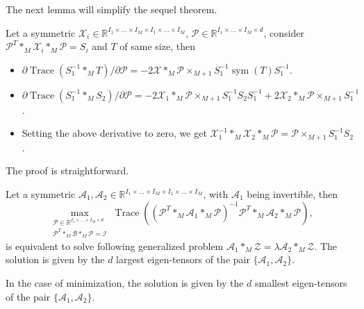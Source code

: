 \documentclass{siamltex}
\begin{document}
\medskip
\noindent
The next lemma will simplify the sequel theorem.
\begin{lemma}\label{pop:derivative_trace}
Let a symmetric $\mathcal{X}_i \in \mathbb{R}^{I_1 \times \ldots \times I_M \times I_1 \times \ldots \times I_M}$, $\mathcal{P} \in \mathbb{R}^{I_1 \times \ldots \times I_M \times d}$, consider $\mathcal{P}^T *_M \mathcal{X}_i *_M \mathcal{P}= S_i$ and $T$ of same size, then
\begin{itemize}
\item $\partial \operatorname{Trace}\left(S_1 ^{-1} *_M T\right)/\partial \mathcal{P}=-2\mathcal{X} *_M \mathcal{P} \times_{M+1} S_1^{-1} \operatorname{sym}(T) S_1^{-1} $.
\item $\partial \operatorname{Trace}\left( S_1^{-1} *_M S_2\right)/\partial \mathcal{P}=-2\mathcal{X}_1 *_M \mathcal{P} \times_{M+1} S_1^{-1} S_2 S_1^{-1} + 2 \mathcal{X}_2 *_M \mathcal{P} \times_{M+1} S_1^{-1}$.
\item Setting the above derivative to zero, we get $\mathcal{X}_1^{-1} *_M \mathcal{X}_2 *_M \mathcal{P}=\mathcal{P} \times_{M+1} S_1^{-1} S_2$.
\end{itemize}
\end{lemma}
\noindent
The proof is straightforward.
\begin{theorem}\label{thm:tr_pos_def_2}
Let a symmetric $\mathcal{A}_1, \mathcal{A}_2 \in \mathbb{R}^{I_1 \times \ldots \times I_M \times I_1 \times \ldots \times I_M}$, with $\mathcal{A}_1$ being invertible, then
\[\max_{\substack{\mathcal{P} \in \mathbb{R}^{I_1 \times \ldots \times I_M \times d}\\ \mathcal{P}^T *_M \mathcal{B} *_M \mathcal{P}=\mathcal{I}}} \operatorname{Trace}\left( \left(\mathcal{P}^T *_M \mathcal{A}_1 *_M \mathcal{P}\right)^{-1}\mathcal{P}^T *_M \mathcal{A}_2 *_M \mathcal{P}\right), \] 
is equivalent to solve following generalized problem $ \mathcal{A}_1 *_M \mathcal{Z}=\lambda \mathcal{A}_2 *_M \mathcal{Z}$.
The solution is given by the $d$ largest eigen-tensors of the pair $\{\mathcal{A}_1, \mathcal{A}_2\}$.
\\
\end{theorem}
In the case of minimization, the solution is given by the $d$ smallest eigen-tensors of the pair $\{\mathcal{A}_1, \mathcal{A}_2\}$.
\end{document}

